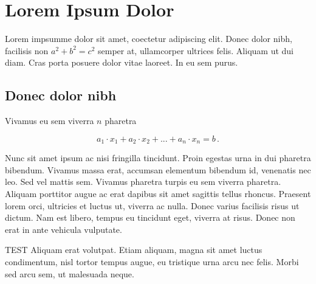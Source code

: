 

\setcounter{chapter}{0} 

\chapter{Lorem Ipsum Dolor} \label{mychapter}

Lorem impsumme dolor sit amet, coectetur adipiscing elit. Donec dolor nibh, facilisis non $a^2 + b^2 = c^2$ semper at, ullamcorper ultrices felis. Aliquam ut dui diam. Cras porta posuere dolor vitae laoreet. In eu sem purus. 

\section{Donec dolor nibh}
\label{myfirstsection}

Vivamus  eu sem viverra $n$ pharetra

\begin{equation} \label{myeq.1}
a_1\cdot x_1+a_2\cdot x_2+...+a_n\cdot x_n=b\,.
\end{equation}


Nunc sit amet ipsum ac nisi fringilla tincidunt. Proin egestas urna in dui pharetra bibendum. Vivamus massa erat, accumsan elementum bibendum id, venenatis nec leo. Sed vel mattis sem. Vivamus pharetra turpis eu sem viverra pharetra. Aliquam porttitor augue ac erat dapibus sit amet sagittis tellus rhoncus. Praesent lorem orci, ultricies et luctus ut, viverra ac nulla. Donec varius facilisis risus ut dictum. Nam est libero, tempus eu tincidunt eget, viverra at risus. Donec non erat in ante vehicula vulputate.

TEST Aliquam erat volutpat. Etiam aliquam, magna sit amet luctus condimentum, nisl tortor tempus augue, eu tristique urna arcu nec felis. Morbi sed arcu sem, ut malesuada neque.


